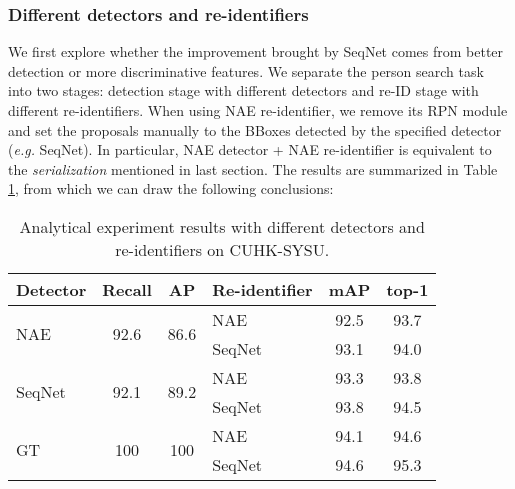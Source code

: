 \documentclass[letterpaper]{article} \usepackage{aaai21}  \usepackage{times}  \usepackage{helvet} \usepackage{courier}  \usepackage[hyphens]{url}  \usepackage{graphicx} \urlstyle{rm} \def\UrlFont{\rm}  \usepackage{natbib}  \usepackage{caption} \usepackage{multirow}
\begin{document}
\subsubsection{Different detectors and re-identifiers}
We first explore whether the improvement brought by SeqNet comes from better detection or more discriminative features. We separate the person search task into two stages: detection stage with different detectors and re-ID stage with different re-identifiers. When using NAE re-identifier, we remove its RPN module and set the proposals manually to the BBoxes detected by the specified detector (\textit{e.g.} SeqNet). In particular, NAE detector + NAE re-identifier is equivalent to the \textit{serialization} mentioned in last section. The results are summarized in Table \ref{diff_detectors_identifiers}, from which we can draw the following conclusions:

\begin{table}[t]
    \centering
\resizebox{0.8\columnwidth}{!}
    {
        \begin{tabular}{|l|cc|l|cc|}
            \hline
            \textbf{Detector}       & \textbf{Recall}       & \textbf{AP}           & \textbf{Re-identifier} & \textbf{mAP} & \textbf{top-1} \\ \hline \hline
\multirow{2}{*}{NAE}    & \multirow{2}{*}{92.6} & \multirow{2}{*}{86.6} & NAE                     & 92.5         & 93.7           \\
                                    &                       &                       & SeqNet                  & 93.1         & 94.0           \\ \hline
            \multirow{2}{*}{SeqNet} & \multirow{2}{*}{92.1} & \multirow{2}{*}{89.2} & NAE                     & 93.3         & 93.8           \\
                                    &                       &                       & SeqNet                  & 93.8         & 94.5           \\ \hline
            \multirow{2}{*}{GT}     & \multirow{2}{*}{100}  & \multirow{2}{*}{100}  & NAE                     & 94.1         & 94.6           \\
                                    &                       &                       & SeqNet                  & 94.6         & 95.3           \\ \hline
        \end{tabular}
    }
    \caption{Analytical experiment results with different detectors and re-identifiers on CUHK-SYSU.}
    \label{diff_detectors_identifiers}
\end{table}
\end{document}
